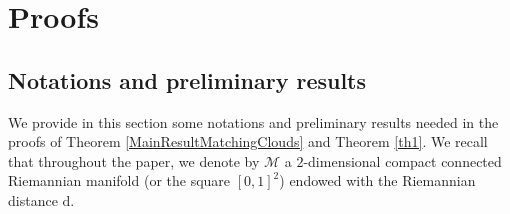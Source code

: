 \documentclass[11pt,a4paper,oneside]{amsart}
\numberwithin{equation}{section}
\newcommand{\dd}{\mathrm{d}}
\newcommand{\LL}{\mathrm{L}}
\newcommand{\nc}[1]{\textcolor{red}{[N: #1]}}
\begin{document}
%
%
%
%
%
%
%
\section{Proofs}
\subsection{Notations and preliminary results}\label{sec:preliminary}
%
We provide in this section some notations and preliminary results needed in the proofs of Theorem \ref{MainResultMatchingClouds} and Theorem \ref{th1}. We recall that throughout the paper, we denote by $\mathcal{M}$ a $2$-dimensional compact connected Riemannian manifold (or the square $[0,1]^2$) endowed with the Riemannian distance $\dd$.
%
\end{document}
